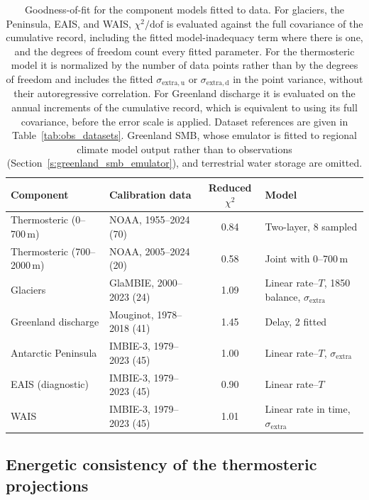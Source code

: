 \documentclass[12pt]{article}
\begin{document}
\begin{table}[!htbp]
\centering
\caption{Goodness-of-fit for the component models fitted to data. For glaciers, the Peninsula, EAIS, and WAIS, $\chi^2/\mathrm{dof}$ is evaluated against the full covariance of the cumulative record, including the fitted model-inadequacy term where there is one, and the degrees of freedom count every fitted parameter. For the thermosteric model it is normalized by the number of data points rather than by the degrees of freedom and includes the fitted $\sigma_{\mathrm{extra,u}}$ or $\sigma_{\mathrm{extra,d}}$ in the point variance, without their autoregressive correlation. For Greenland discharge it is evaluated on the annual increments of the cumulative record, which is equivalent to using its full covariance, before the error scale is applied. Dataset references are given in Table~\ref{tab:obs_datasets}. Greenland SMB, whose emulator is fitted to regional climate model output rather than to observations (Section~\ref{s:greenland_smb_emulator}), and terrestrial water storage are omitted.}
\label{tab:skill_metrics}
\footnotesize
\setlength{\tabcolsep}{4.5pt}
\begin{tabular}{llcl}
\toprule
Component & Calibration data & Reduced $\chi^2$ & Model \\
\midrule
Thermosteric (0--700\,m)  & NOAA, 1955--2024 (70)     & 0.84 & Two-layer, 8 sampled \\
Thermosteric (700--2000\,m) & NOAA, 2005--2024 (20)   & 0.58 & Joint with 0--700\,m \\
Glaciers                  & GlaMBIE, 2000--2023 (24)  & 1.09 & Linear rate--$T$, 1850 balance, $\sigma_{\mathrm{extra}}$ \\
Greenland discharge       & Mouginot, 1978--2018 (41) & 1.45 & Delay, 2 fitted \\
Antarctic Peninsula       & IMBIE-3, 1979--2023 (45)  & 1.00 & Linear rate--$T$, $\sigma_{\mathrm{extra}}$ \\
EAIS (diagnostic)         & IMBIE-3, 1979--2023 (45)  & 0.90 & Linear rate--$T$ \\
WAIS                      & IMBIE-3, 1979--2023 (45)  & 1.01 & Linear rate in time, $\sigma_{\mathrm{extra}}$ \\
\bottomrule
\end{tabular}
\end{table}

\subsection{Energetic consistency of the thermosteric projections}
\label{s:energy_check}
\end{document}
